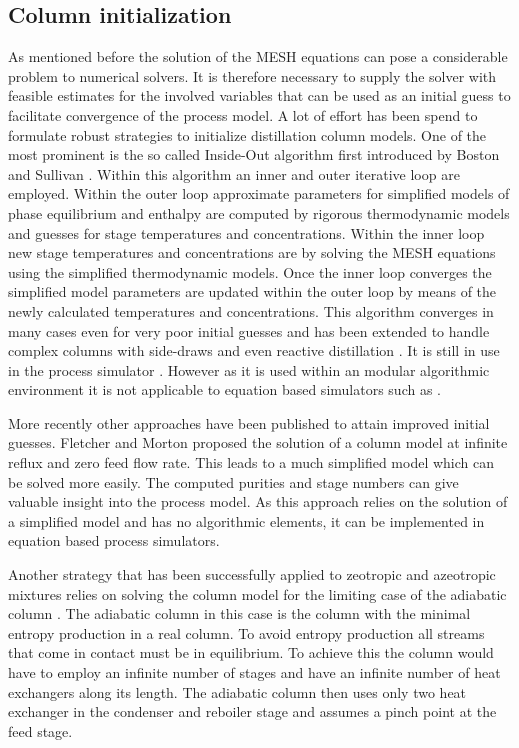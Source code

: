     \subsection{Column initialization}
        As mentioned before the solution of the MESH equations can pose a considerable problem
        to numerical solvers. It is therefore necessary to supply the solver with feasible
        estimates for the involved variables that can be used as an initial guess to facilitate
        convergence of the process model. A lot of effort has been spend to formulate robust strategies
        to initialize distillation column models. One of the most prominent is the so called
        Inside-Out algorithm first introduced by Boston and Sullivan \cite{Boston.1974}. Within this
        algorithm an inner and outer iterative loop are employed. Within the outer loop approximate
        parameters for simplified models of phase equilibrium and enthalpy are computed by rigorous
        thermodynamic models and guesses for stage temperatures and concentrations. Within the
        inner loop new stage temperatures and concentrations are by solving the MESH equations
        using the simplified thermodynamic models. Once the inner loop converges the simplified
        model parameters are updated within the outer loop by means of the newly calculated
        temperatures and concentrations. This algorithm converges in many cases even for very poor initial
        guesses and has been extended to handle complex columns with side-draws and even reactive
        distillation \cite{BOSTONJ.F..}. It is still in use in the process simulator \aspen.
        However as it is used within an modular algorithmic environment it is not applicable
        to equation based simulators such as \gproms.

        More recently other approaches have been published to attain improved initial guesses.
        Fletcher and Morton \cite{Fletcher.2000} proposed the solution of a column model at
        infinite reflux and zero feed flow rate. This leads to a much simplified model which can
        be solved more easily. The computed purities and stage numbers can give valuable insight
        into the process model. As this approach relies on the solution of a simplified model
        and has no algorithmic elements, it can be implemented in equation based process simulators.

        Another strategy that has been successfully applied to zeotropic and azeotropic mixtures
        relies on solving the column model for the limiting case of the adiabatic column \cite{Barttfeld.2002}.
        The adiabatic column in this case is the column with the minimal entropy production in a real column.
        To avoid entropy production all streams that come in contact must be in equilibrium. To achieve this
        the column would have to employ an infinite number of stages and have an infinite number of
        heat exchangers along its length. The adiabatic column then uses only two heat exchanger in the
        condenser and reboiler stage and assumes a pinch point at the feed stage. 

